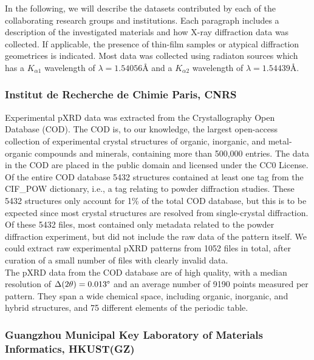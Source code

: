 In the following, we will describe the datasets contributed by each of the collaborating research groups and institutions. Each paragraph includes a description of the investigated materials and how X-ray diffraction data was collected. If applicable, the presence of thin-film samples or atypical diffraction geometrices is indicated. Most data was collected using  radiaton sources which has a $K_{\alpha1}$ wavelength of $\lambda=1.54056\text{\AA}$ and a $K_{\alpha2}$ wavelength of $\lambda=1.54439\text{\AA}$.

\subsubsection*{Institut de Recherche de Chimie Paris, CNRS}

Experimental pXRD data was extracted from the Crystallography Open Database (COD)\cite{Grazulis2009, Vaitkus2023}. The COD is, to our knowledge, the largest open-access collection of experimental crystal structures of organic, inorganic, and metal-organic compounds and minerals, containing more than 500,000 entries. The data in the COD are placed in the public domain and licensed under the CC0 License. Of the entire COD database 5432 structures contained at least one tag from the {CIF\_POW} dictionary, i.e., a tag relating to powder diffraction studies. These 5432 structures only account for 1\% of the total COD database, but this is to be expected since most crystal structures are resolved from single-crystal diffraction. Of these 5432 files, most contained only metadata related to the powder diffraction experiment, but did not include the raw data of the pattern itself. We could extract raw experimental pXRD patterns from 1052 files in total, after curation of a small number of files with clearly invalid data. \\

The pXRD data from the COD database are of high quality, with a median resolution of $\Delta(2\theta) = 0.013\degree$ and an average number of 9190 points measured per pattern. They span a wide chemical space, including organic, inorganic, and hybrid structures, and 75 different elements of the periodic table.

\subsubsection*{Guangzhou Municipal Key Laboratory of Materials Informatics, HKUST(GZ)}


